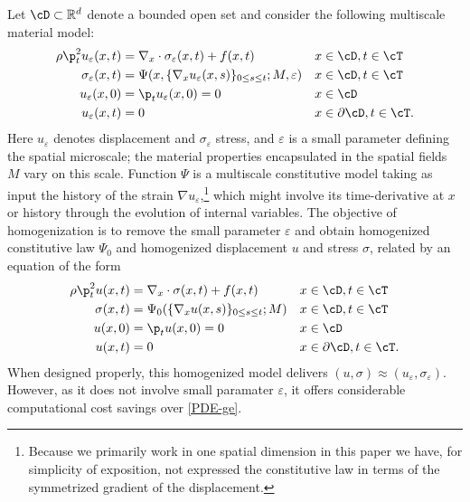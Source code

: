 \documentclass[letterpaper,11pt]{article}
\begin{document}
Let $\cD \subset \mathbb{R}^d$ denote a bounded open set and consider the following multiscale material model:
\begin{subequations}\label{PDE-ge}
\begin{align}
    \rho \p_t^2 u_{\varepsilon}(x,t) & = \nabla_x \cdot \sigma_{\varepsilon}(x,t) + f(x,t) && x \in \cD, t \in \cT \\
    \sigma_{\varepsilon}(x,t)&= \Psi(x,\{\nabla_x u_{\varepsilon}(x,s)\}_{0 \le s \le t}; M, \varepsilon) && x \in \cD, t\in \cT\\
    u_{\varepsilon}(x,0) &= \p_tu_{\varepsilon}(x,0)=0 && x \in \cD\\
    u_{\varepsilon}(x,t) &= 0 && x \in \partial \cD, t \in \cT .
\end{align}
\end{subequations}
Here $u_{\varepsilon}$ denotes displacement and $\sigma_{\varepsilon}$ stress, and $\varepsilon$ is a small parameter defining the spatial microscale; the material properties encapsulated in the spatial fields $M$ vary on this scale. Function $\Psi$ is a multiscale constitutive model taking as input the history of the strain $\nabla u_{\varepsilon}$,\footnote{Because we primarily work in one spatial dimension in this paper we have, for simplicity of exposition, not expressed the constitutive law in terms of the symmetrized gradient of the displacement.}
which might involve its time-derivative at $x$ or history through the evolution of internal variables. The objective of homogenization \cite{bensoussan2011asymptotic,blanc2023homogenization,pavliotis2008multiscale} is to remove the small parameter $\varepsilon$ and obtain homogenized constitutive law $\Psi_0$ and homogenized displacement $u$ and stress $\sigma$, related by an equation of the form
\begin{subequations}\label{PDE-e}
\begin{align}
    \rho \p_t^2 u(x,t) & = \nabla_x \cdot \sigma(x,t) + f(x,t) && x \in \cD, t \in \cT \\
    \sigma(x,t)&= \Psi_0(\{\nabla_x u(x,s)\}_{0 \le s \le t}; M) && x \in \cD, t\in \cT\label{eq:Psi_0}\\
    u(x,0) &= \p_tu(x,0)=0 && x \in \cD\\
    u(x,t) &= 0 && x \in \partial \cD, t \in \cT.
\end{align}
\end{subequations}
When designed properly, this homogenized model delivers $(u,\sigma) \approx (u_{\varepsilon},\sigma_{\varepsilon}).$ However, as it does not involve small paramater $\varepsilon$, it offers considerable computational cost savings over \eqref{PDE-ge}.
\end{document}
